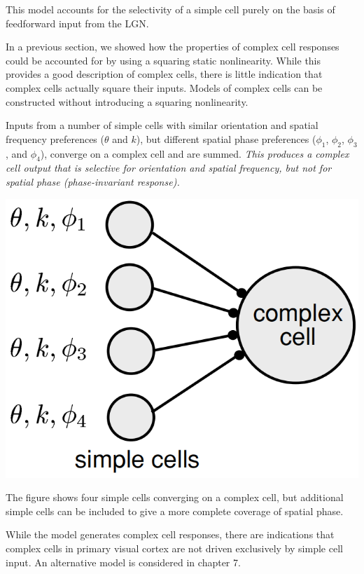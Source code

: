 \begin{rem}
  This model accounts for the selectivity of a simple cell purely on the basis of feedforward input from the LGN.
\end{rem}

\begin{rem}
  In a previous section, we showed how the properties of complex cell responses could be accounted for by using a squaring static nonlinearity. While this provides a good description of complex cells, there is little indication that complex cells actually square their inputs. Models of complex cells can be constructed without introducing a squaring nonlinearity.
\end{rem}

\begin{exm}
  \label{exm:complexCellModel}
   Inputs from a number of simple cells with similar orientation and
spatial frequency preferences ($\theta$ and $k$), but different spatial phase preferences ($\phi_1$, $\phi_2$, $\phi_3$, and $\phi_4$), converge on a complex cell and are summed. \emph{This produces a complex cell output that is selective for orientation and spatial frequency, but not for spatial phase (phase-invariant response).}
  \begin{center}
    \includegraphics[scale=0.18]{./png/complexCellModel}
  \end{center}
  The figure shows four simple cells converging on a complex cell, but additional simple cells can be included to give a more complete coverage of spatial phase.
\end{exm}

\begin{rem}
   While the model generates complex cell responses, there are indications that complex cells in primary visual cortex are not driven exclusively by simple cell input. An alternative model is considered in chapter 7.
\end{rem}

